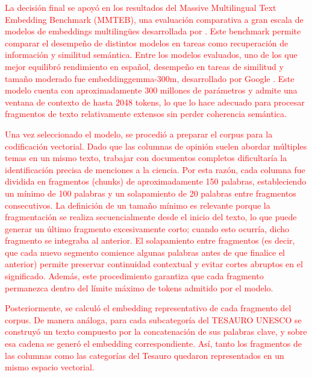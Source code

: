 \documentclass[11pt,a4paper]{article}
\begin{document}
\textcolor{red}{La decisión final se apoyó en los resultados del Massive Multilingual Text Embedding Benchmark (MMTEB), una evaluación comparativa a gran escala de modelos de embeddings multilingües desarrollada por \cite{enevoldsen2025mmtebmassivemultilingualtext}. Este benchmark permite comparar el desempeño de distintos modelos en tareas como recuperación de información y similitud semántica. Entre los modelos evaluados, uno de los que mejor equilibró rendimiento en español, desempeño en tareas de similitud y tamaño moderado fue embeddinggemma-300m, desarrollado por Google \cite{vera2025embeddinggemmapowerfullightweighttext}. Este modelo cuenta con aproximadamente 300 millones de parámetros y admite una ventana de contexto de hasta 2048 tokens, lo que lo hace adecuado para procesar fragmentos de texto relativamente extensos sin perder coherencia semántica.}

\textcolor{red}{Una vez seleccionado el modelo, se procedió a preparar el corpus para la codificación vectorial. Dado que las columnas de opinión suelen abordar múltiples temas en un mismo texto, trabajar con documentos completos dificultaría la identificación precisa de menciones a la ciencia. Por esta razón, cada columna fue dividida en fragmentos (chunks) de aproximadamente 150 palabras, estableciendo un mínimo de 100 palabras y un solapamiento de 20 palabras entre fragmentos consecutivos. La definición de un tamaño mínimo es relevante porque la fragmentación se realiza secuencialmente desde el inicio del texto, lo que puede generar un último fragmento excesivamente corto; cuando esto ocurría, dicho fragmento se integraba al anterior. El solapamiento entre fragmentos (es decir, que cada nuevo segmento comience algunas palabras antes de que finalice el anterior) permite preservar continuidad contextual y evitar cortes abruptos en el significado. Además, este procedimiento garantiza que cada fragmento permanezca dentro del límite máximo de tokens admitido por el modelo.}

\textcolor{red}{Posteriormente, se calculó el embedding representativo de cada fragmento del corpus. De manera análoga, para cada subcategoría del TESAURO UNESCO se construyó un texto compuesto por la concatenación de sus palabras clave, y sobre esa cadena se generó el embedding correspondiente. Así, tanto los fragmentos de las columnas como las categorías del Tesauro quedaron representados en un mismo espacio vectorial.}
\end{document}
